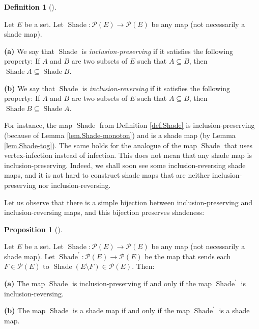 \documentclass[numbers=enddot,12pt,final,onecolumn]{scrartcl}%
\theoremstyle{definition}
\newtheorem{prop}[theo]{Proposition}
\newenvironment{proposition}[1][]
{\begin{prop}[#1]\begin{leftbar}}
{\end{leftbar}\end{prop}}
\newtheorem{defi}[theo]{Definition}
\newenvironment{definition}[1][]
{\begin{defi}[#1]\begin{leftbar}}
{\end{leftbar}\end{defi}}
\begin{document}
\begin{definition}
\label{def.inclusion-pres}Let $E$ be a set. Let $\operatorname*{Shade}%
:\mathcal{P}\left(  E\right)  \rightarrow\mathcal{P}\left(  E\right)  $ be any
map (not necessarily a shade map).

\textbf{(a)} We say that $\operatorname*{Shade}$ is
\emph{inclusion-preserving} if it satisfies the following property: If $A$ and
$B$ are two subsets of $E$ such that $A\subseteq B$, then
$\operatorname*{Shade}A\subseteq\operatorname*{Shade}B$.

\textbf{(b)} We say that $\operatorname*{Shade}$ is \emph{inclusion-reversing}
if it satisfies the following property: If $A$ and $B$ are two subsets of $E$
such that $A\subseteq B$, then $\operatorname*{Shade}B\subseteq
\operatorname*{Shade}A$.
\end{definition}

For instance, the map $\operatorname*{Shade}$ from Definition \ref{def.Shade}
is inclusion-preserving (because of Lemma \ref{lem.Shade-monoton}) and is a
shade map (by Lemma \ref{lem.Shade-tog}). The same holds for the analogue of
the map $\operatorname*{Shade}$ that uses vertex-infection instead of
infection. This does not mean that any shade map is inclusion-preserving.
Indeed, we shall soon see some inclusion-reversing shade maps, and it is not
hard to construct shade maps that are neither inclusion-preserving nor inclusion-reversing.

Let us observe that there is a simple bijection between inclusion-preserving
and inclusion-reversing maps, and this bijection preserves shadeness:

\begin{proposition}
\label{prop.Shade.dual}Let $E$ be a set. Let $\operatorname*{Shade}%
:\mathcal{P}\left(  E\right)  \rightarrow\mathcal{P}\left(  E\right)  $ be any
map (not necessarily a shade map). Let $\operatorname*{Shade}\nolimits^{\prime
}:\mathcal{P}\left(  E\right)  \rightarrow\mathcal{P}\left(  E\right)  $ be
the map that sends each $F\in\mathcal{P}\left(  E\right)  $ to
$\operatorname*{Shade}\left(  E\setminus F\right)  \in\mathcal{P}\left(
E\right)  $. Then:

\textbf{(a)} The map $\operatorname*{Shade}$ is inclusion-preserving if and
only if the map $\operatorname*{Shade}\nolimits^{\prime}$ is inclusion-reversing.

\textbf{(b)} The map $\operatorname*{Shade}$ is a shade map if and only if the
map $\operatorname*{Shade}\nolimits^{\prime}$ is a shade map.
\end{proposition}
\end{document}
